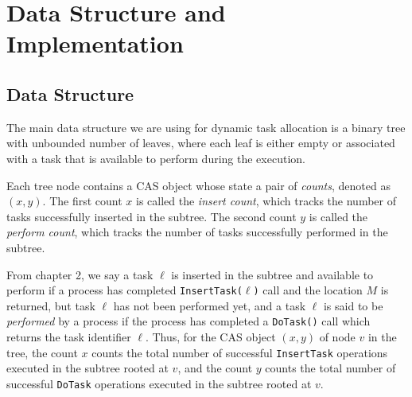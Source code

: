 \chapter{Data Structure and Implementation}



\section{Data Structure}
The main data structure we are using for dynamic task allocation is a binary tree with unbounded number of leaves,
where each leaf is either empty or associated with a task that is available to perform during the execution.

Each tree node contains a CAS object whose state a pair of \emph{counts}, denoted as $(x, y)$.
The first count $x$ is called the \emph{insert count}, which tracks the number of tasks successfully inserted in
the subtree. The second count $y$ is called the \emph{perform count}, which tracks the number of tasks successfully
performed in the subtree.

From chapter 2, we say a task $\ell$ is inserted in the subtree and available to perform if a process has completed
\texttt{InsertTask(}$\ell$\texttt{)} call and the location $M$ is returned, but task $\ell$ has not been performed yet, and
a task $\ell$ is said to be \emph{performed} by a process if the process has completed a \texttt{DoTask()} call
which returns the task identifier $\ell$. Thus, for the CAS object $(x, y)$ of node $v$ in the tree,
the count $x$ counts the total number of successful \texttt{InsertTask} operations
executed in the subtree rooted at $v$, and  the count $y$ counts the total number of successful \texttt{DoTask} operations
executed in the subtree rooted at $v$.

